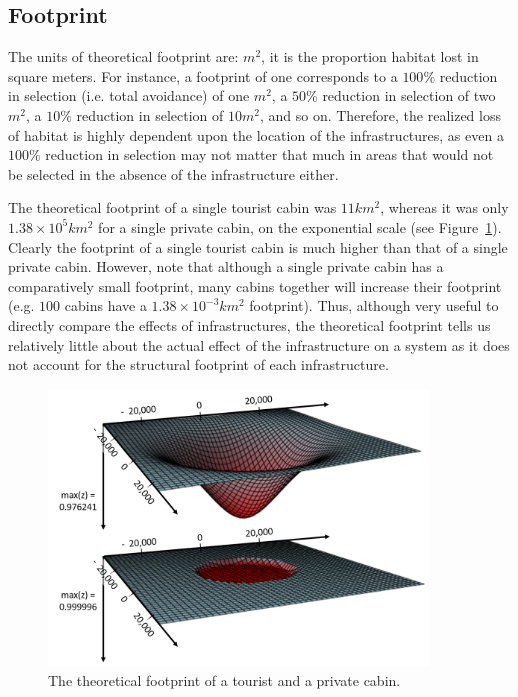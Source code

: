 \documentclass{article}
\begin{document}
\subsection{Footprint}

The units of theoretical footprint are: $m^2$, it is the proportion habitat lost in square meters. For instance, a footprint of one corresponds to a $100 \%$ reduction in selection (i.e. total avoidance) of one $m^2$, a $50 \%$ reduction in selection of two $m^2$, a $10 \%$ reduction in selection of $10 m^2$, and so on. Therefore, the realized loss of habitat is highly dependent upon the location of the infrastructures, as even a $100 \%$ reduction in selection may not matter that much in areas that would not be selected in the absence of the infrastructure either.  

The theoretical footprint of a single tourist cabin was $11 km^2$, whereas it was only $1.38 \times 10^{5} km^2$ for a single private cabin, on the exponential scale (see Figure~\ref{fig:theoretical_footprint}). Clearly the footprint of a single tourist cabin is much higher than that of a single private cabin. However, note that although a single private cabin has a comparatively small footprint, many cabins together will increase their footprint (e.g. $100$ cabins have a $1.38 \times 10^{-3} km^2$ footprint). Thus, although very useful to directly compare the effects of infrastructures, the theoretical footprint tells us relatively little about the actual effect of the infrastructure on a system as it does not account for the structural footprint of each infrastructure.

\begin{figure}
\centering
\includegraphics[width=0.9\textwidth]{figures/theoretical_footprint.png}
\caption{\label{fig:theoretical_footprint} The theoretical footprint of a tourist and a private cabin.}
\end{figure}
\end{document}
